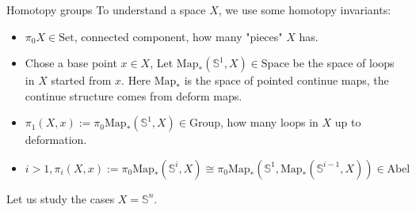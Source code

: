\documentclass[12pt]{beamer}
\begin{document}
\begin{frame}{Homotopy groups}
To understand a space $X$, we use some homotopy invariants:
\pause
\begin{itemize}
  \item $\pi_0 X \in \mathrm{Set} $, connected component, how many "pieces" $X$ has. 
    \pause
  \item Chose a base point $x\in X$, Let $ \mathrm{Map}_*(\mathbb{S}^1,X)  \in \mathrm{Space}$ be the space of loops in $X$ started from $x$. Here $\mathrm{Map}_*$ is the space of pointed continue maps, the continue structure comes from deform maps. 
    \pause
  \item $ \pi_1(X,x) := \pi_0\mathrm{Map}_*(\mathbb{S}^1,X) \in \mathrm{Group}$, how many loops in $X$ up to deformation.
    \pause
  \item $i>1, \pi_i(X,x) := \pi_0\mathrm{Map}_*(\mathbb{S}^i,X)\cong \pi_0\mathrm{Map}_*(\mathbb{S}^1,\mathrm{Map}_*(\mathbb{S}^{i-1},X)) \in \mathrm{Abel}$
\end{itemize}
\pause
Let us study the cases $X=\mathbb{S}^n$.
\end{frame}
\end{document}
